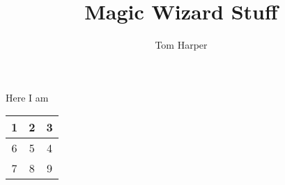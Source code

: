 \documentclass[11pt,a4paper]{article}
\author{Tom Harper}
\title{Magic Wizard Stuff}
\begin{document}
\maketitle


Here I am\\

\begin{tabular}{|c|c|c|}
\hline 
1 & 2 & 3 \\ 
\hline 
6 & 5 & 4 \\ 
\hline 
7 & 8 & 9 \\ 
\hline 
\end{tabular} 
\end{document}
